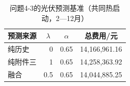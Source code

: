 \par
\begin{table}[!htbp]
\centering
\caption{问题4-3的光伏预测基准（共同热启动，2—12月）}\label{tab:q4-3-forecast}
\normalsize
\begin{tabular}{lrrr}
\toprule
\multicolumn{1}{c}{预测来源} & \multicolumn{1}{c}{$\lambda$} & \multicolumn{1}{c}{$\alpha$} & \multicolumn{1}{c}{总费用/元} \\
\midrule
纯历史 & 0 & 0.65 & 14,166,961.16 \\
纯附件三 & 1 & 0.65 & 14,258,363.92 \\
融合 & 0.5 & 0.65 & 14,044,885.25 \\
\bottomrule
\end{tabular}
\end{table}
\par
